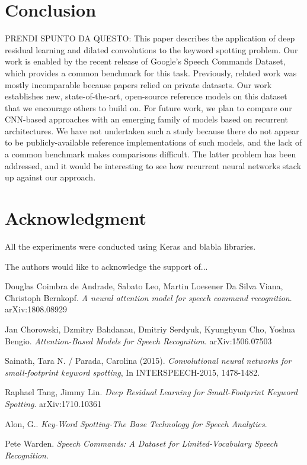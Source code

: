 \documentclass[conference]{IEEEtran}
\begin{document}
\section{Conclusion}
PRENDI SPUNTO DA QUESTO: This paper describes the application of deep residual learning and dilated convolutions to the keyword spotting problem. Our work is enabled by the recent release of Google’s Speech Commands Dataset, which provides a common benchmark for this task. Previously, related work was mostly incomparable because papers relied on private datasets. Our work establishes new, state-of-the-art, open-source reference models on this dataset that we encourage others to build on. For future work, we plan to compare our CNN-based approaches with an emerging family of models based on recurrent architectures. We have not undertaken such a study because there do not appear to be publicly-available reference implementations of such models, and the lack of a common benchmark makes comparisons difficult. The latter problem has been addressed, and it would be interesting to see how
recurrent neural networks stack up against our approach.

\section*{Acknowledgment}
All the experiments were conducted using Keras and blabla libraries.

The authors would like to acknowledge the support of...


\begin{thebibliography}{1}
Douglas Coimbra de Andrade, Sabato Leo, Martin Loesener Da Silva Viana, Christoph Bernkopf. \textit{A neural attention model for speech command recognition}. arXiv:1808.08929

Jan Chorowski, Dzmitry Bahdanau, Dmitriy Serdyuk, Kyunghyun Cho, Yoshua Bengio. \textit{Attention-Based Models for Speech Recognition}. arXiv:1506.07503

Sainath, Tara N. / Parada, Carolina (2015). \textit{Convolutional neural networks for small-footprint keyword spotting}, In INTERSPEECH-2015, 1478-1482.

Raphael Tang, Jimmy Lin. \textit{Deep Residual Learning for Small-Footprint Keyword Spotting}. arXiv:1710.10361

Alon, G.. \textit{Key-Word Spotting-The Base Technology for Speech Analytics}.

Pete Warden. \textit{Speech Commands: A Dataset for Limited-Vocabulary Speech Recognition}.
\end{thebibliography}
\end{document}

